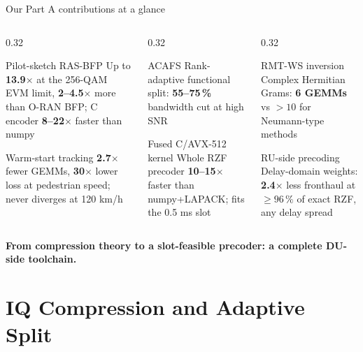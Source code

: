 \documentclass[aspectratio=169,11pt,xcolor=table]{beamer}
\newcommand{\gd}[1]{\textcolor{good}{\textbf{#1}}}
\newcommand{\takeaway}[1]{%
  \vfill
  \begin{alertblock}{}\centering\textbf{#1}\end{alertblock}}
\begin{document}
\begin{frame}{Our Part A contributions at a glance}
  \begin{columns}[T]
    \begin{column}{0.32\textwidth}
      \begin{block}{Pilot-sketch RAS-BFP}
        Up to \gd{13.9$\times$} at the 256-QAM EVM limit, \gd{2--4.5$\times$} more than O-RAN BFP;
        C encoder \gd{8--22$\times$} faster than numpy
      \end{block}
      \begin{exampleblock}{Warm-start tracking}
        \gd{2.7$\times$} fewer GEMMs, \gd{30$\times$} lower loss at pedestrian speed;
        never diverges at 120 km/h
      \end{exampleblock}
    \end{column}
    \begin{column}{0.32\textwidth}
      \begin{exampleblock}{ACAFS}
        Rank-adaptive functional split: \gd{55--75\,\%} bandwidth cut at high SNR
      \end{exampleblock}
      \begin{block}{Fused C/AVX-512 kernel}
        Whole RZF precoder \gd{10--15$\times$} faster than numpy+LAPACK; fits the 0.5 ms slot
      \end{block}
    \end{column}
    \begin{column}{0.32\textwidth}
      \begin{block}{RMT-WS inversion}
        Complex Hermitian Grams: \gd{6 GEMMs} vs $>10$ for Neumann-type methods
      \end{block}
      \begin{exampleblock}{RU-side precoding}
        Delay-domain weights: \gd{2.4$\times$} less fronthaul at $\ge 96\,\%$ of exact RZF, any delay spread
      \end{exampleblock}
    \end{column}
  \end{columns}
  \takeaway{From compression theory to a slot-feasible precoder: a complete DU-side toolchain.}
\end{frame}

\section{IQ Compression and Adaptive Split}
\end{document}
